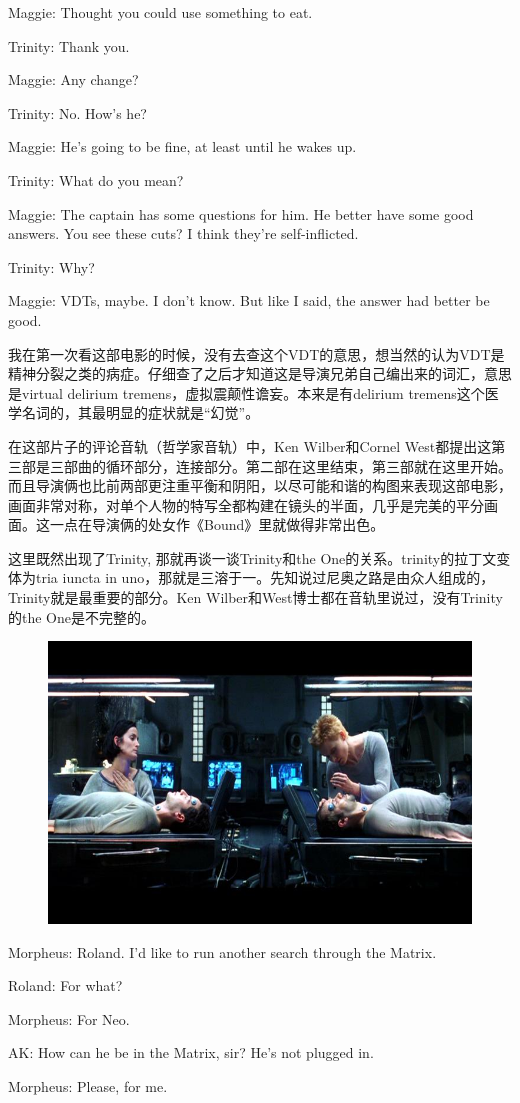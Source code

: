 \documentclass[UTF8]{ctexart}
\newenvironment{myquote}{\color{green} \setlength{\leftskip}{6em} \setlength{\rightskip}{4em} \setlength{\parindent}{-2em}}{\par}
\begin{document}
\begin{myquote}
Maggie: Thought you could use something to eat.

Trinity: Thank you.

Maggie: Any change?

Trinity: No. How's he?

Maggie: He's going to be fine, at least until he wakes up.

Trinity: What do you mean?

Maggie: The captain has some questions for him. He better have some good answers. You see these cuts? I think they're self-inflicted.

Trinity: Why?

Maggie: VDTs, maybe. I don't know. But like I said, the answer had better be good.
\end{myquote}

我在第一次看这部电影的时候，没有去查这个VDT的意思，想当然的认为VDT是精神分裂之类的病症。仔细查了之后才知道这是导演兄弟自己编出来的词汇，意思是virtual delirium tremens，虚拟震颠性谵妄。本来是有delirium tremens这个医学名词的，其最明显的症状就是“幻觉”。

在这部片子的评论音轨（哲学家音轨）中，Ken Wilber和Cornel West都提出这第三部是三部曲的循环部分，连接部分。第二部在这里结束，第三部就在这里开始。而且导演俩也比前两部更注重平衡和阴阳，以尽可能和谐的构图来表现这部电影，画面非常对称，对单个人物的特写全都构建在镜头的半面，几乎是完美的平分画面。这一点在导演俩的处女作《Bound》里就做得非常出色。

这里既然出现了Trinity, 那就再谈一谈Trinity和the One的关系。trinity的拉丁文变体为tria iuncta in uno，那就是三溶于一。先知说过尼奥之路是由众人组成的，Trinity就是最重要的部分。Ken Wilber和West博士都在音轨里说过，没有Trinity的the One是不完整的。

\begin{figure}[htb]
\centering
\includegraphics[width=0.5\linewidth]{fig/3c8e8b13f5346bd0f7039e12.jpg}
\end{figure}

\begin{myquote}
Morpheus: Roland. I'd like to run another search through the Matrix.

Roland: For what?

Morpheus: For Neo.

AK: How can he be in the Matrix, sir? He's not plugged in.

Morpheus: Please, for me.
\end{myquote}
\end{document}
